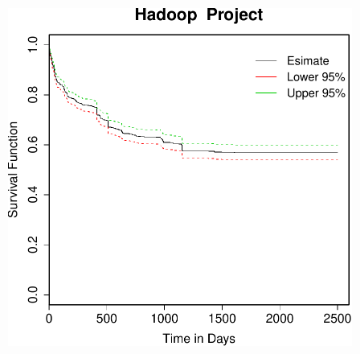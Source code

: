 \begin{figure}[t]
\begin{subfigure}[b]{0.31\textwidth}
	\end{subfigure}
	~
	~
	\begin{subfigure}[b]{0.31\textwidth}
		\includegraphics[width=\textwidth]{figures/Survival/hadoop.pdf}
	\end{subfigure}


\end{figure}
